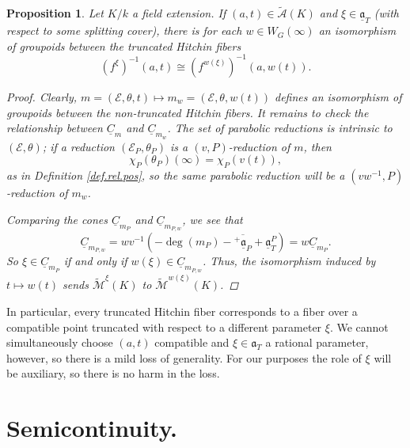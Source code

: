 \documentclass[openany]{amsbook}
\newtheorem{proposition}[theorem]{Proposition}
\theoremstyle{definition}
\theoremstyle{remark}
\numberwithin{equation}{section}
\newcommand{\cA}{\mathcal{A}}
\newcommand{\cM}{\mathcal{M}}
\newcommand{\cE}{\mathcal{E}}
\newcommand{\ol}[1]{\overline{#1}}
\newcommand{\ul}[1]{\underline{#1}}
\renewcommand{\-}{\operatorname{-}}
\renewcommand{\a}{\mathfrak{a}}
\newcommand{\ctM}{\widetilde{\cM}}
\newcommand{\ctA}{\widetilde{\cA}}
\newcommand{\ga}{\ul{\a}}
\newcommand{\gobtcone}{{}^+ \ul{\a}}
\begin{document}
\begin{proposition}\label{prop.tw.Hitchin.fiber.compat.comparison}
    Let $K/k$ a field extension. If $(a,t) \in \ctA(K)$ and $\xi \in \ga_T$ (with respect to some splitting cover), there is for each $w \in W_G(\infty)$ an isomorphism of groupoids between the truncated Hitchin fibers
    $$
        (f^\xi)^{-1}(a,t) \cong (f^{w(\xi)})^{-1}(a, w(t)).
    $$
    \begin{proof}
        Clearly, $m =(\cE, \theta, t) \mapsto m_w = (\cE, \theta, w(t))$ defines an isomorphism of groupoids between the non-truncated Hitchin fibers. It remains to check the relationship between $\ul{C}_m$ and $\ul{C}_{m_w}$. The set of parabolic reductions is intrinsic to $(\cE, \theta)$; if a reduction $(\cE_P, \theta_P)$ is a $(v,P)$-reduction of $m$, then
        $$
            \chi_P(\theta_P)(\infty) = \chi_P(v(t)),
        $$
        as in Definition \ref{def.rel.pos}, so the same parabolic reduction will be a $(vw^{-1},P)$-reduction of $m_w$. 

        Comparing the cones $\ul{C}_{m_P}$ and $\ul{C}_{m_{P,w}}$, we see that 
        $$
            \ul{C}_{m_{P,w}} = wv^{-1}(-\deg(m_P) - \ol{\gobtcone_P} + \ga_T^P) = w \ul{C}_{m_P}.
        $$
        So $\xi \in \ul{C}_{m_P}$ if and only if $w(\xi) \in \ul{C}_{m_{P,w}}$. Thus, the isomorphism induced by $t \mapsto w(t)$ sends $\ctM^\xi(K)$ to $\ctM^{w(\xi)}(K)$.
    \end{proof}
\end{proposition}
In particular, every truncated Hitchin fiber corresponds to a fiber over a compatible point truncated with respect to a different parameter $\xi$. We cannot simultaneously choose $(a,t)$ compatible and $\xi \in \a_T$ a rational parameter, however, so there is a mild loss of generality. For our purposes the role of $\xi$ will be auxiliary, so there is no harm in the loss.


\section{Semicontinuity.}
\end{document}

